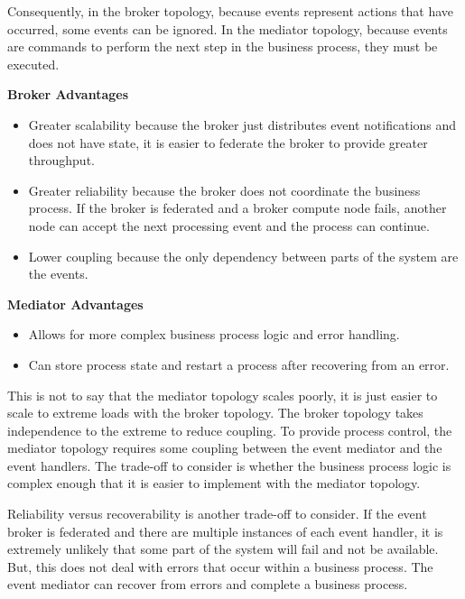 Consequently, in the broker topology, because events represent actions that have occurred, some events can be ignored.
In the mediator topology, because events are commands to perform the next step in the business process, they must be executed.

\vspace{4mm}\noindent
\textbf{Broker Advantages}

\begin{itemize}
    \item Greater scalability because the broker just distributes event notifications and does not have state,
            it is easier to federate the broker to provide greater throughput.
    \item Greater reliability because the broker does not coordinate the business process.
            If the broker is federated and a broker compute node fails, another node can accept the next processing event and the process can continue.
    \item Lower coupling because the only dependency between parts of the system are the events.
\end{itemize}

\noindent
\textbf{Mediator Advantages}

\begin{itemize}
    \item Allows for more complex business process logic and error handling.
    \item Can store process state and restart a process after recovering from an error.
\end{itemize}

This is not to say that the mediator topology scales poorly, it is just easier to scale to extreme loads with the broker topology.
The broker topology takes independence to the extreme to reduce coupling.
To provide process control, the mediator topology requires some coupling between the event mediator and the event handlers.
The trade-off to consider is whether the business process logic is complex enough that it is easier to implement with the mediator topology.

Reliability versus recoverability is another trade-off to consider.
If the event broker is federated and there are multiple instances of each event handler,
it is extremely unlikely that some part of the system will fail and not be available.
But, this does not deal with errors that occur within a business process.
The event mediator can recover from errors and complete a business process.

